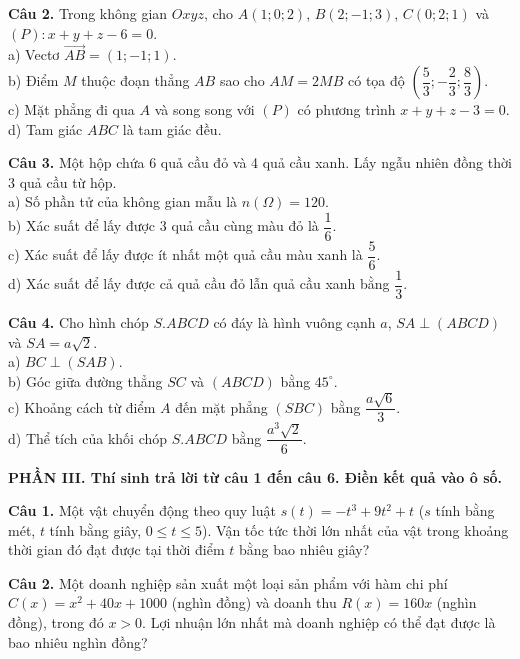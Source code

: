 \documentclass[12pt,a4paper]{article}
\begin{document}
\vspace{0.2cm}
\textbf{Câu 2.} Trong không gian $Oxyz$, cho $A(1; 0; 2)$, $B(2; -1; 3)$, $C(0; 2; 1)$ và $(P): x + y + z - 6 = 0$. \\
a) Vectơ $\vec{AB} = (1; -1; 1)$. \\
b) Điểm $M$ thuộc đoạn thẳng $AB$ sao cho $AM = 2MB$ có tọa độ $\left(\dfrac{5}{3}; -\dfrac{2}{3}; \dfrac{8}{3}\right)$. \\
c) Mặt phẳng đi qua $A$ và song song với $(P)$ có phương trình $x + y + z - 3 = 0$. \\
d) Tam giác $ABC$ là tam giác đều.

\vspace{0.2cm}
\textbf{Câu 3.} Một hộp chứa 6 quả cầu đỏ và 4 quả cầu xanh. Lấy ngẫu nhiên đồng thời 3 quả cầu từ hộp. \\
a) Số phần tử của không gian mẫu là $n(\Omega) = 120$. \\
b) Xác suất để lấy được 3 quả cầu cùng màu đỏ là $\dfrac{1}{6}$. \\
c) Xác suất để lấy được ít nhất một quả cầu màu xanh là $\dfrac{5}{6}$. \\
d) Xác suất để lấy được cả quả cầu đỏ lẫn quả cầu xanh bằng $\dfrac{1}{3}$.

\vspace{0.2cm}
\textbf{Câu 4.} Cho hình chóp $S.ABCD$ có đáy là hình vuông cạnh $a$, $SA \perp (ABCD)$ và $SA = a\sqrt{2}$. \\
a) $BC \perp (SAB)$. \\
b) Góc giữa đường thẳng $SC$ và $(ABCD)$ bằng $45^\circ$. \\
c) Khoảng cách từ điểm $A$ đến mặt phẳng $(SBC)$ bằng $\dfrac{a\sqrt{6}}{3}$. \\
d) Thể tích của khối chóp $S.ABCD$ bằng $\dfrac{a^3\sqrt{2}}{6}$.

\vspace{0.4cm}
\textbf{\large PHẦN III. Thí sinh trả lời từ câu 1 đến câu 6. Điền kết quả vào ô số.}

\vspace{0.2cm}
\textbf{Câu 1.} Một vật chuyển động theo quy luật $s(t) = -t^3 + 9t^2 + t$ ($s$ tính bằng mét, $t$ tính bằng giây, $0 \le t \le 5$). Vận tốc tức thời lớn nhất của vật trong khoảng thời gian đó đạt được tại thời điểm $t$ bằng bao nhiêu giây?

\vspace{0.2cm}
\textbf{Câu 2.} Một doanh nghiệp sản xuất một loại sản phẩm với hàm chi phí $C(x) = x^2 + 40x + 1000$ (nghìn đồng) và doanh thu $R(x) = 160x$ (nghìn đồng), trong đó $x > 0$. Lợi nhuận lớn nhất mà doanh nghiệp có thể đạt được là bao nhiêu nghìn đồng?
\end{document}
